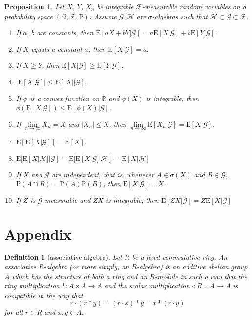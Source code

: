 \documentclass{report}
\newtheorem{definition}{Definition}[section]
\newtheorem{proposition}{Proposition}[section]
\theoremstyle{nonumberplain}
\begin{document}
\begin{proposition}
	Let $X$, $Y$, $X_n$ be integrable $\mathcal{F}$-measurable random variables on a probability space $(\Omega,\mathcal{F},\mathrm{P})$. Assume  $\mathcal{G},\mathcal{H}$ are $\sigma$-algebras such that $\mathcal{H}\subset\mathcal{G}\subset\mathcal{F}$.
	\begin{enumerate}  
		\item If $a$, $b$ are constants, then $\mathrm{E}[aX+bY|\mathcal{G}]=a\mathrm{E}[X|\mathcal{G}]+b\mathrm{E}[Y|\mathcal{G}]$.
		\item If $X$ equals a constant $a$, then $\mathrm{E}[X|\mathcal{G}]=a$.
		\item If $X\ge Y$,  then $\mathrm{E}[X|\mathcal{G}]\ge\mathrm{E}[Y|\mathcal{G}]$.
		\item $\left|\mathrm{E}[X|\mathcal{G}]\right|\le\mathrm{E}[\left|X\right||\mathcal{G}]$.
		\item If $\phi$ is a convex function on $\mathbb{R}$ and $\phi(X)$ is integrable, then $\phi(\mathrm{E}[X|\mathcal{G}])\le\mathrm{E}[\phi(X)|\mathcal{G}]$.
		\item If $\lim\limits_{n\to\infty}X_n=X$ and $|X_n|\le X$, then $\lim\limits_{n\to\infty}\mathrm{E}[X_n|\mathcal{G}]=\mathrm{E}[X|\mathcal{G}]$.
		\item $\mathrm{E}[\mathrm{E}[X|\mathcal{G}]]=\mathrm{E}[X]$.
		\item $\mathrm{E}[\mathrm{E}[X|\mathcal{H}]|\mathcal{G}]=\mathrm{E}[\mathrm{E}[X|\mathcal{G}]|\mathcal{H}]=\mathrm{E}[X|\mathcal{H}]$
		\item If $X$ and $\mathcal{G}$ are independent, that is, whenever $A\in\sigma(X)$ and $B\in\mathcal{G}$, $\mathrm{P}(A\cap B)= \mathrm{P}(A) \mathrm{P}(B)$, then $\mathrm{E}[X|\mathcal{G}]=X$.
		\item If $Z$ is $\mathcal{G}$-measurable and $ZX$ is integrable, then $\mathrm{E}[ZX|\mathcal{G}]=Z\mathrm{E}[X|\mathcal{G}]$
	\end{enumerate}
\end{proposition}

\chapter*{Appendix}
\begin{definition}[associative algebra]
	Let $R$ be a fixed commutative ring. An associative $R$-algebra (or more simply, an $R$-algebra) is an additive abelian group $A$ which has the structure of both a ring and an $R$-module in such a way that the ring multiplication $*:A\times A\to A$ and the scalar multiplication $\cdot:R\times A\to A$ is compatible in the way that
	\[
		r\cdot (x*y)=(r\cdot x)*y=x*(r\cdot y)
	\]
	for all $r \in R$ and $x, y \in A$.
\end{definition}
\end{document}
